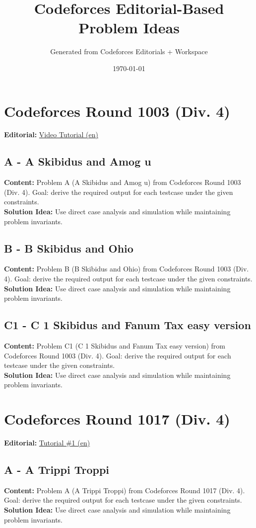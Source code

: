 \documentclass[11pt]{article}
\title{Codeforces Editorial-Based Problem Ideas}
\author{Generated from Codeforces Editorials + Workspace}
\date{\today}
\begin{document}
\maketitle
\tableofcontents
\newpage
\section{Codeforces Round 1003 (Div. 4)}
\textbf{Editorial:} \href{https://codeforces.com/blog/entry/139327}{Video Tutorial (en)}

\subsection{A - A Skibidus and Amog u}
\textbf{Content:} Problem A (A Skibidus and Amog u) from Codeforces Round 1003 (Div. 4). Goal: derive the required output for each testcase under the given constraints.\\
\textbf{Solution Idea:} Use direct case analysis and simulation while maintaining problem invariants.

\subsection{B - B Skibidus and Ohio}
\textbf{Content:} Problem B (B Skibidus and Ohio) from Codeforces Round 1003 (Div. 4). Goal: derive the required output for each testcase under the given constraints.\\
\textbf{Solution Idea:} Use direct case analysis and simulation while maintaining problem invariants.

\subsection{C1 - C 1 Skibidus and Fanum Tax easy version}
\textbf{Content:} Problem C1 (C 1 Skibidus and Fanum Tax easy version) from Codeforces Round 1003 (Div. 4). Goal: derive the required output for each testcase under the given constraints.\\
\textbf{Solution Idea:} Use direct case analysis and simulation while maintaining problem invariants.

\section{Codeforces Round 1017 (Div. 4)}
\textbf{Editorial:} \href{https://codeforces.com/blog/entry/141796}{Tutorial \#1 (en)}

\subsection{A - A Trippi Troppi}
\textbf{Content:} Problem A (A Trippi Troppi) from Codeforces Round 1017 (Div. 4). Goal: derive the required output for each testcase under the given constraints.\\
\textbf{Solution Idea:} Use direct case analysis and simulation while maintaining problem invariants.
\end{document}
